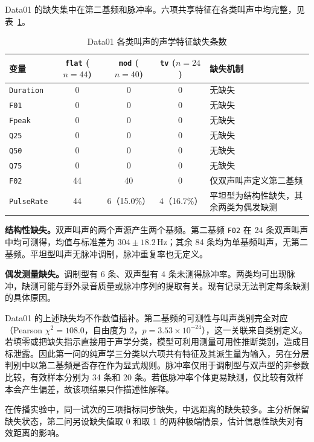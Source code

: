 \documentclass{apmcmthesis}
\begin{document}
Data01 的缺失集中在第二基频和脉冲率。六项共享特征在各类叫声中均完整，见表~\ref{tab:prep_missing}。
\begin{table}[htbp]
\centering
\caption{Data01 各类叫声的声学特征缺失条数}\label{tab:prep_missing}
\small\setlength{\tabcolsep}{4pt}
\begin{tabularx}{\linewidth}{@{}>{\raggedright\arraybackslash}p{.27\linewidth}ccc>{\raggedright\arraybackslash}X@{}}
\toprule
变量 & \shortstack{\texttt{flat}\\($n=44$)} & \shortstack{\texttt{mod}\\($n=40$)} & \shortstack{\texttt{tv}\\($n=24$)} & 缺失机制 \\
\midrule
\texttt{Duration} & 0 & 0 & 0 & 无缺失 \\
\texttt{F01} & 0 & 0 & 0 & 无缺失 \\
\texttt{Fpeak} & 0 & 0 & 0 & 无缺失 \\
\texttt{Q25} & 0 & 0 & 0 & 无缺失 \\
\texttt{Q50} & 0 & 0 & 0 & 无缺失 \\
\texttt{Q75} & 0 & 0 & 0 & 无缺失 \\
\texttt{F02} & 44 & 40 & 0 & 仅双声叫声定义第二基频 \\
\texttt{PulseRate} & 44 & 6（15.0\%） & 4（16.7\%） & 平坦型为结构性缺失，其余两类为偶发缺测 \\
\bottomrule
\end{tabularx}
\end{table}

\textbf{结构性缺失。}双声叫声的两个声源产生两个基频。第二基频 \texttt{F02} 在 24 条双声叫声中均可测得，均值与标准差为 $304\pm18.2\,\mathrm{Hz}$；其余 84 条均为单基频叫声，无第二基频。平坦型叫声无脉冲调制，脉冲重复率也无定义。

\textbf{偶发测量缺失。}调制型有 6 条、双声型有 4 条未测得脉冲率。两类均可出现脉冲，缺测可能与野外录音质量或脉冲序列的提取有关。现有记录无法判定每条缺测的具体原因。

Data01 的上述缺失均不作数值插补。第二基频的可测性与叫声类别完全对应（Pearson $\chi^2=108.0$，自由度为 2，$p=3.53\times10^{-24}$），这一关联来自类别定义。若填零或把缺失指示直接用于声学分类，模型可利用测量可用性推断类别，造成目标泄露。因此第一问的纯声学三分类以六项共有特征及其派生量为输入，另在分层判别中以第二基频是否存在作为显式规则。脉冲率仅用于调制型与双声型的非参数比较，有效样本分别为 34 条和 20 条。若低脉冲率个体更易缺测，仅比较有效样本会产生偏差，故该项结果只作描述性解释。

在传播实验中，同一试次的三项指标同步缺失，中远距离的缺失较多。主分析保留缺失状态，第二问另设缺失值取 0 和取 1 的两种极端情景，估计信息性缺失对有效距离的影响。
\end{document}
